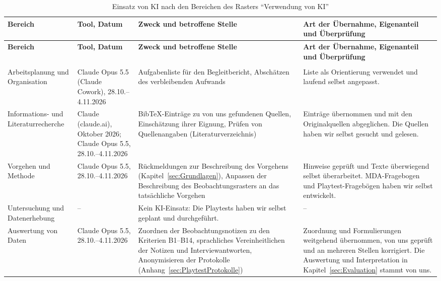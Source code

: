 \documentclass[../Main.tex]{subfiles}
\begin{document}
{\small
\renewcommand{\arraystretch}{1.3}
\begin{longtable}{|>{\raggedright\arraybackslash}p{2.3cm}|>{\raggedright\arraybackslash}p{2.4cm}|>{\raggedright\arraybackslash}p{4.4cm}|>{\raggedright\arraybackslash}p{4.6cm}|}
    \hline
    \textbf{Bereich} & \textbf{Tool, Datum} & \textbf{Zweck und betroffene Stelle} & \textbf{Art der Übernahme, Eigenanteil und Überprüfung} \\
    \hline
\endfirsthead
    \hline
    \textbf{Bereich} & \textbf{Tool, Datum} & \textbf{Zweck und betroffene Stelle} & \textbf{Art der Übernahme, Eigenanteil und Überprüfung} \\
    \hline
\endhead
    \multicolumn{4}{r}{\textit{Fortsetzung auf der nächsten Seite}} \\
\endfoot
\caption{Einsatz von KI nach den Bereichen des Rasters \enquote{Verwendung von KI}}
\label{tab:KI}
\endlastfoot
    Arbeitsplanung und Organisation & Claude Opus 5.5 (Claude Cowork), 28.10.--4.11.2026 & Aufgabenliste für den Begleitbericht, Abschätzen des verbleibenden Aufwands & Liste als Orientierung verwendet und laufend selbst angepasst. \\
    \hline
    Informations- und Literaturrecherche & Claude (claude.ai), Oktober 2026; Claude Opus 5.5, 28.10.--4.11.2026 & BibTeX-Einträge zu von uns gefundenen Quellen, Einschätzung ihrer Eignung, Prüfen von Quellenangaben (Literaturverzeichnis) & Einträge übernommen und mit den Originalquellen abgeglichen. Die Quellen haben wir selbst gesucht und gelesen. \\
    \hline
    Vorgehen und Methode & Claude Opus 5.5, 28.10.--4.11.2026 & Rückmeldungen zur Beschreibung des Vorgehens (Kapitel~\ref{sec:Grundlagen}), Anpassen der Beschreibung des Beobachtungsrasters an das tatsächliche Vorgehen & Hinweise geprüft und Texte überwiegend selbst überarbeitet. MDA-Fragebogen und Playtest-Fragebögen haben wir selbst entwickelt. \\
    \hline
    Untersuchung und Datenerhebung & -- & Kein KI-Einsatz: Die Playtests haben wir selbst geplant und durchgeführt. & -- \\
    \hline
    Auswertung von Daten & Claude Opus 5.5, 28.10.--4.11.2026 & Zuordnen der Beobachtungsnotizen zu den Kriterien B1--B14, sprachliches Vereinheitlichen der Notizen und Interviewantworten, Anonymisieren der Protokolle (Anhang~\ref{sec:PlaytestProtokolle}) & Zuordnung und Formulierungen weitgehend übernommen, von uns geprüft und an mehreren Stellen korrigiert. Die Auswertung und Interpretation in Kapitel~\ref{sec:Evaluation} stammt von uns. \\

\end{longtable}}
\end{document}
